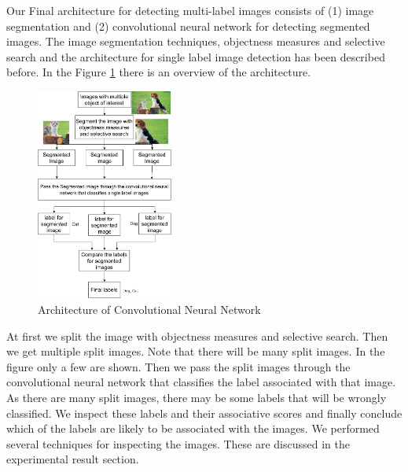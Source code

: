 Our Final architecture for detecting multi-label images consists of (1) image segmentation and (2) convolutional neural network for detecting segmented images. The image segmentation techniques, objectness measures and selective search and the architecture for single label image detection has been described before. In the Figure \ref{finalarch} there is an overview of the architecture.
\begin{figure}[!htb]
  \centering
  \includegraphics[width=0.4\textwidth]{images/finalarch.png}
  \caption{Architecture of Convolutional Neural Network}\label{finalarch}
\end{figure}
At first we split the image with objectness measures and selective search. Then we get multiple split images. Note that there will be many split images. In the figure only a few are shown. Then we pass the split images through the convolutional neural network that classifies the label associated with that image. As there are many split images, there may be some labels that will be wrongly classified. We inspect these labels and their associative scores and finally conclude which of the labels are likely to be associated with the images. We performed several techniques for inspecting the images. These are discussed in the experimental result section.
